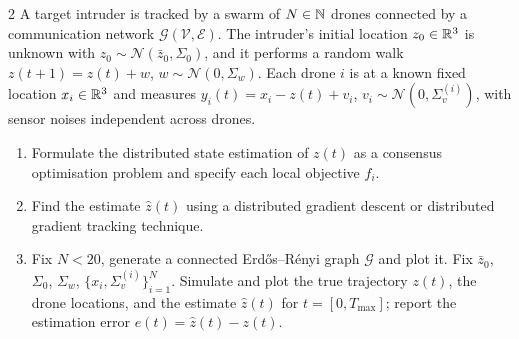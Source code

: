 \documentclass[a4paper, 11pt]{article}
\begin{document}
\clearpage
\begin{problem}{2}
A target intruder is tracked by a swarm of $N\in\mathbb{N}$ drones connected by a communication network $\mathcal{G}(\mathcal{V},\mathcal{E})$. The intruder's initial location $z_0\in\mathbb{R}^3$ is unknown with $z_0\sim\mathcal{N}(\bar z_0,\Sigma_0)$, and it performs a random walk $z(t+1)=z(t)+w$, $w\sim\mathcal{N}(0,\Sigma_w)$. Each drone $i$ is at a known fixed location $x_i\in\mathbb{R}^3$ and measures $y_i(t)=x_i-z(t)+v_i$, $v_i\sim\mathcal{N}(0,\Sigma_v^{(i)})$, with sensor noises independent across drones.
\begin{enumerate}
    \item Formulate the distributed state estimation of $z(t)$ as a consensus optimisation problem and specify each local objective $f_i$.
    \item Find the estimate $\hat z(t)$ using a distributed gradient descent or distributed gradient tracking technique.
    \item Fix $N<20$, generate a connected Erd\H{o}s--R\'enyi graph $\mathcal{G}$ and plot it. Fix $\bar z_0$, $\Sigma_0$, $\Sigma_w$, $\{x_i,\Sigma_v^{(i)}\}_{i=1}^N$. Simulate and plot the true trajectory $z(t)$, the drone locations, and the estimate $\hat z(t)$ for $t=[0,T_{\max}]$; report the estimation error $e(t)=\hat z(t)-z(t)$.
\end{enumerate}
\end{problem}
\end{document}
